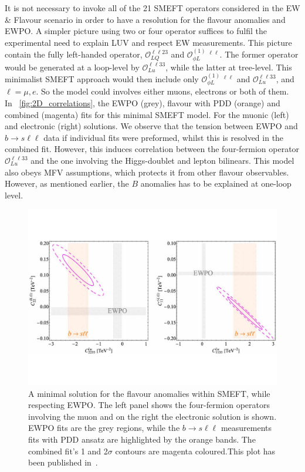It is not necessary to invoke all of the 21 SMEFT operators considered in the { EW \& Flavour} scenario in order to have a resolution for the flavour anomalies and EWPO. A simpler picture using two or four operator suffices to fulfil the experimental need to explain LUV and respect EW measurements. This picture contain the fully left-handed operator, $\mathcal{O}_{LQ}^{\ell \ell 2 3}$ and $\mathcal{O}_{\phi L}^{(1)} \ ^{\ell \ell}$. The former operator would be generated at a loop-level by $\mathcal{O}_{Lu}^{\ell \ell 3 3}$, while the latter at tree-level.  This minimalist SMEFT approach would then include only  $\mathcal{O}_{\phi L}^{(1)} \ ^{\ell \ell}$ and $\mathcal{O}_{Lu}^{\ell \ell 3 3}$, and $\ell= \mu, e$. So the model could involves either muons, electrons or both of them.\\ 
In~ \autoref{fig:2D_correlations}, the EWPO (grey), flavour with PDD (orange) and combined (magenta) fits for this minimal SMEFT model. For the muonic (left) and electronic (right) solutions. We observe that the tension between EWPO and $b \to s \ell \ell$ data if individual fits were preformed, whilst this is resolved in the combined fit. However, this induces correlation between the four-fermion operator $\mathcal{O}_{Lu}^{\ell \ell 3 3}$ and the one involving the Higgs-doublet and lepton bilinears. This model also obeys MFV assumptions, which protects it from other flavour observables. However, as mentioned earlier, the $B$ anomalies has to be explained at one-loop level. 
\begin{figure}[htpb!]
	\includegraphics[width=\textwidth]{figures/CHL_CLu.pdf}
	\caption{ A minimal solution for the flavour anomalies within SMEFT, while respecting EWPO. The left panel shows the four-fermion operators involving the muon and on the right the electronic solution is shown. EWPO fits are the grey regions, while the $b \to s\ell \ell$ measurements fits with PDD ansatz are highlighted by the orange bands. The combined fit's 1 and 2$\sigma$ contours are magenta coloured.This plot has been published in~\cite{Alasfar:2020mne}.  } 
	\label{fig:2D_correlations}
\end{figure}
